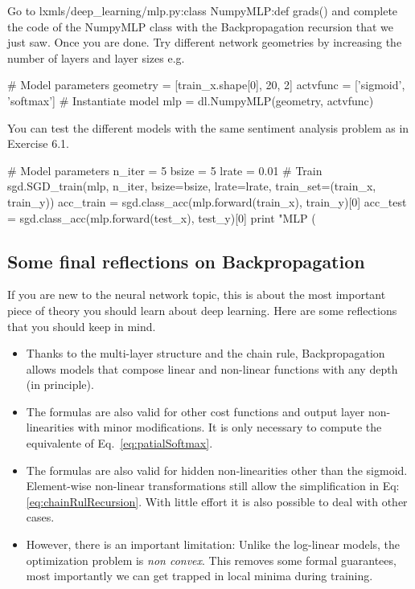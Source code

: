 \begin{exercise}
Go to lxmls/deep\_learning/mlp.py:class NumpyMLP:def grads() and complete the
code of the NumpyMLP class with the Backpropagation recursion that we just saw.
Once you are done. Try different network geometries by increasing the number of
layers and layer sizes e.g.
\begin{python}
# Model parameters
geometry = [train_x.shape[0], 20, 2]
actvfunc = ['sigmoid', 'softmax'] 
# Instantiate model
mlp      = dl.NumpyMLP(geometry, actvfunc) 
\end{python}
You can test the different models with the same sentiment analysis problem as
in Exercise 6.1. 
\begin{python}
# Model parameters
n_iter = 5
bsize  = 5
lrate  = 0.01
# Train
sgd.SGD_train(mlp, n_iter, bsize=bsize, lrate=lrate, train_set=(train_x, train_y))
acc_train = sgd.class_acc(mlp.forward(train_x), train_y)[0]
acc_test  = sgd.class_acc(mlp.forward(test_x), test_y)[0]
print "MLP (%
\end{python}
\end{exercise}

\subsection{Some final reflections on Backpropagation}

If you are new to the neural network topic, this is about the most important
piece of theory you should learn about deep learning. Here are some reflections
that you should keep in mind.

\begin{itemize}
\item Thanks to the multi-layer structure and the chain rule, Backpropagation allows models that compose linear and non-linear functions with any depth (in principle\footnotemark). 

\item The formulas are also valid for other cost functions and output layer non-linearities with minor modifications. It is only necessary to compute the equivalente of Eq.~\ref{eq:patialSoftmax}. 

\item The formulas are also valid for hidden non-linearities other than the sigmoid. Element-wise non-linear transformations still allow the simplification in Eq: \ref{eq:chainRulRecursion}. With little effort it is also possible to deal with other cases.

\item However, there is an important limitation: Unlike the log-linear models, the optimization problem is \textit{non convex}. This removes some formal guarantees, most importantly we can get trapped in local minima during training.
\end{itemize}

